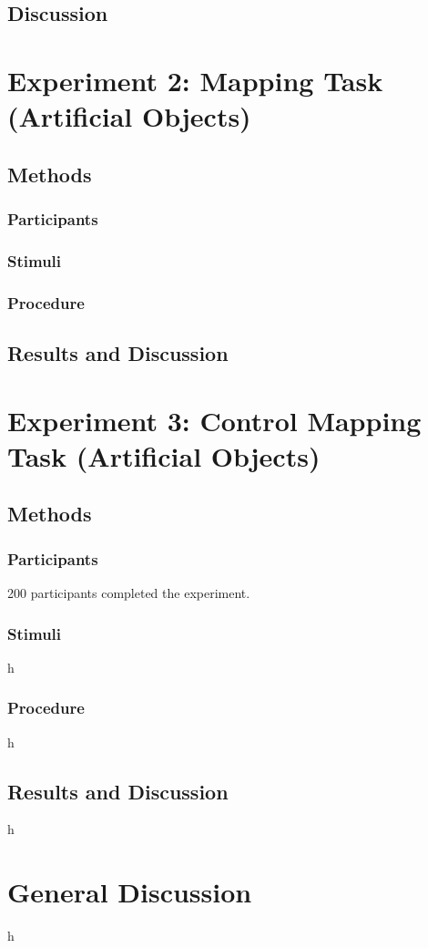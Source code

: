 \documentclass[man]{apa2}
\begin{document}
\subsection{Discussion}



\section{Experiment 2: Mapping Task (Artificial Objects)}


\subsection{Methods}
\subsubsection{Participants} 
\subsubsection{Stimuli}

\subsubsection{Procedure}


\subsection{Results and Discussion}

				
\section{Experiment 3: Control Mapping Task (Artificial Objects)}

\subsection{Methods}
\subsubsection{Participants} 200 participants completed the experiment.
\subsubsection{Stimuli} h

\subsubsection{Procedure}
h

\subsection{Results and Discussion}
h

\section{General Discussion}

h







\newpage
\theappendix 

\section{}
\end{document}

